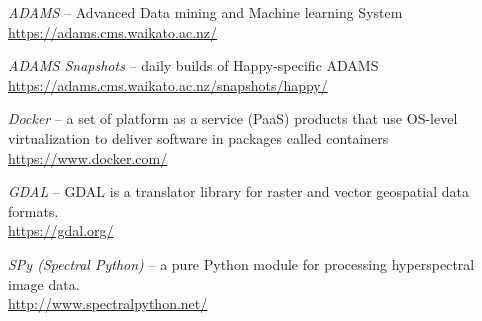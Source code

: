 
\begin{thebibliography}{999}

		\textit{ADAMS} -- Advanced Data mining and Machine learning System \\
		\url{https://adams.cms.waikato.ac.nz/}{}

		\textit{ADAMS Snapshots} -- daily builds of Happy-specific ADAMS \\
		\url{https://adams.cms.waikato.ac.nz/snapshots/happy/}{}

  	\textit{Docker} -- a set of platform as a service (PaaS) products that use OS-level
	  virtualization to deliver software in packages called containers \\
	  \url{https://www.docker.com/}{}

		\textit{GDAL} -- GDAL is a translator library for raster and vector geospatial data formats.  \\
		\url{https://gdal.org/}{}

		\textit{SPy (Spectral Python)} -- a pure Python module for processing hyperspectral image data. \\
		\url{http://www.spectralpython.net/}{}

\end{thebibliography}
